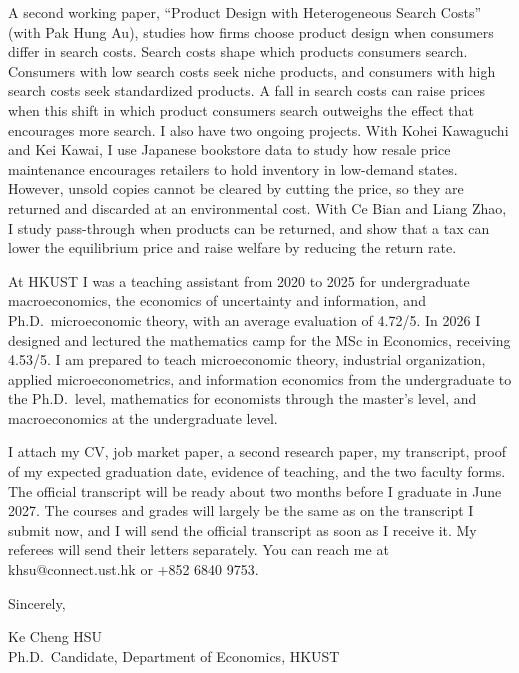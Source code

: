 \documentclass[11pt]{article}
\begin{document}
A second working paper, ``Product Design with Heterogeneous Search Costs'' (with Pak Hung Au), studies how firms choose product design when consumers differ in search costs. Search costs shape which products consumers search. Consumers with low search costs seek niche products, and consumers with high search costs seek standardized products. A fall in search costs can raise prices when this shift in which product consumers search outweighs the effect that encourages more search. I also have two ongoing projects. With Kohei Kawaguchi and Kei Kawai, I use Japanese bookstore data to study how resale price maintenance encourages retailers to hold inventory in low-demand states. However, unsold copies cannot be cleared by cutting the price, so they are returned and discarded at an environmental cost. With Ce Bian and Liang Zhao, I study pass-through when products can be returned, and show that a tax can lower the equilibrium price and raise welfare by reducing the return rate.

At HKUST I was a teaching assistant from 2020 to 2025 for undergraduate macroeconomics, the economics of uncertainty and information, and Ph.D.\ microeconomic theory, with an average evaluation of 4.72/5. In 2026 I designed and lectured the mathematics camp for the MSc in Economics, receiving 4.53/5. I am prepared to teach microeconomic theory, industrial organization, applied microeconometrics, and information economics from the undergraduate to the Ph.D.\ level, mathematics for economists through the master's level, and macroeconomics at the undergraduate level.

I attach my CV, job market paper, a second research paper, my transcript, proof of my expected graduation date, evidence of teaching, and the two faculty forms. The official transcript will be ready about two months before I graduate in June 2027. The courses and grades will largely be the same as on the transcript I submit now, and I will send the official transcript as soon as I receive it. My referees will send their letters separately. You can reach me at khsu@connect.ust.hk or +852 6840 9753.

\vspace{0.45em}
Sincerely,

\vspace{0.45em}
Ke Cheng HSU \\
Ph.D.\ Candidate, Department of Economics, HKUST
\end{document}
